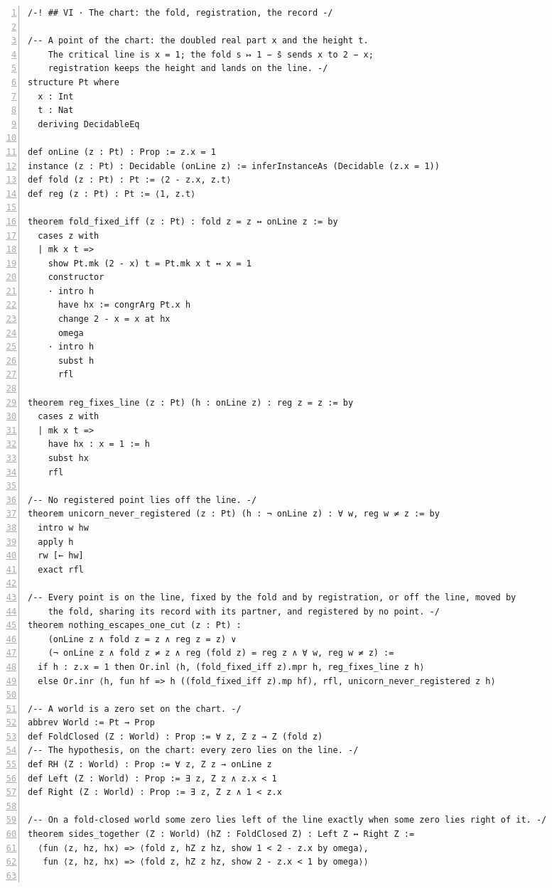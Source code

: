 \documentclass[10pt]{article}
\newcommand{\leansize}{\fontsize{5.5pt}{6.75pt}\selectfont}
\begin{document}
\begin{multicols}{2}
\begin{Verbatim}[numbers=left,firstnumber=1,numbersep=3pt,xleftmargin=2.6em,breaklines=true,breakanywhere=true,breakautoindent=false,breakindent=1.4em,breaksymbolleft={},breakanywheresymbolpre={},fontsize=\leansize]
/-! ## VI · The chart: the fold, registration, the record -/

/-- A point of the chart: the doubled real part x and the height t.
    The critical line is x = 1; the fold s ↦ 1 − s̄ sends x to 2 − x;
    registration keeps the height and lands on the line. -/
structure Pt where
  x : Int
  t : Nat
  deriving DecidableEq

def onLine (z : Pt) : Prop := z.x = 1
instance (z : Pt) : Decidable (onLine z) := inferInstanceAs (Decidable (z.x = 1))
def fold (z : Pt) : Pt := ⟨2 - z.x, z.t⟩
def reg (z : Pt) : Pt := ⟨1, z.t⟩

theorem fold_fixed_iff (z : Pt) : fold z = z ↔ onLine z := by
  cases z with
  | mk x t =>
    show Pt.mk (2 - x) t = Pt.mk x t ↔ x = 1
    constructor
    · intro h
      have hx := congrArg Pt.x h
      change 2 - x = x at hx
      omega
    · intro h
      subst h
      rfl

theorem reg_fixes_line (z : Pt) (h : onLine z) : reg z = z := by
  cases z with
  | mk x t =>
    have hx : x = 1 := h
    subst hx
    rfl

/-- No registered point lies off the line. -/
theorem unicorn_never_registered (z : Pt) (h : ¬ onLine z) : ∀ w, reg w ≠ z := by
  intro w hw
  apply h
  rw [← hw]
  exact rfl

/-- Every point is on the line, fixed by the fold and by registration, or off the line, moved by
    the fold, sharing its record with its partner, and registered by no point. -/
theorem nothing_escapes_one_cut (z : Pt) :
    (onLine z ∧ fold z = z ∧ reg z = z) ∨
    (¬ onLine z ∧ fold z ≠ z ∧ reg (fold z) = reg z ∧ ∀ w, reg w ≠ z) :=
  if h : z.x = 1 then Or.inl ⟨h, (fold_fixed_iff z).mpr h, reg_fixes_line z h⟩
  else Or.inr ⟨h, fun hf => h ((fold_fixed_iff z).mp hf), rfl, unicorn_never_registered z h⟩

/-- A world is a zero set on the chart. -/
abbrev World := Pt → Prop
def FoldClosed (Z : World) : Prop := ∀ z, Z z → Z (fold z)
/-- The hypothesis, on the chart: every zero lies on the line. -/
def RH (Z : World) : Prop := ∀ z, Z z → onLine z
def Left (Z : World) : Prop := ∃ z, Z z ∧ z.x < 1
def Right (Z : World) : Prop := ∃ z, Z z ∧ 1 < z.x

/-- On a fold-closed world some zero lies left of the line exactly when some zero lies right of it. -/
theorem sides_together (Z : World) (hZ : FoldClosed Z) : Left Z ↔ Right Z :=
  ⟨fun ⟨z, hz, hx⟩ => ⟨fold z, hZ z hz, show 1 < 2 - z.x by omega⟩,
   fun ⟨z, hz, hx⟩ => ⟨fold z, hZ z hz, show 2 - z.x < 1 by omega⟩⟩


\end{Verbatim}
\end{multicols}
\end{document}
